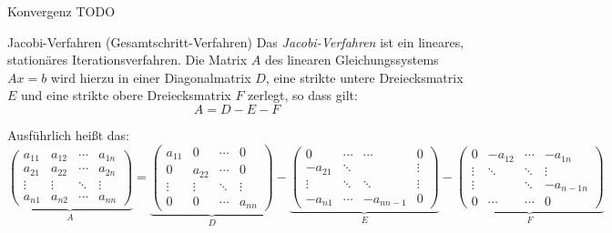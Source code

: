 \begin{example}{Konvergenz}
    TODO
\end{example}

\begin{defi}{Jacobi-Verfahren (Gesamtschritt-Verfahren)}
    Das \emph{Jacobi-Verfahren} ist ein lineares, stationäres Iterationsverfahren.
    Die Matrix $A$ des linearen Gleichungssystems $Ax = b$ wird hierzu in einer Diagonalmatrix $D$, eine strikte untere Dreiecksmatrix $E$ und eine strikte obere Dreiecksmatrix $F$ zerlegt, so dass gilt:
    \[
        A = D - E - F
    \]

    Ausführlich heißt das:
    {
    \footnotesize
    \[
        \underbrace{
            \begin{pmatrix}
                a_{11} & a_{12} & \cdots & a_{1n} \\
                a_{21} & a_{22} & \cdots & a_{2n} \\
                \vdots & \vdots & \ddots & \vdots \\
                a_{n1} & a_{n2} & \cdots & a_{nn}
            \end{pmatrix}
        }_A
        =
        \underbrace{
            \begin{pmatrix}
                a_{11} & 0      & \cdots & 0      \\
                0      & a_{22} & \cdots & 0      \\
                \vdots & \vdots & \ddots & \vdots \\
                0      & 0      & \cdots & a_{nn}
            \end{pmatrix}
        }_D
        -
        \underbrace{
            \begin{pmatrix}
                0        & \cdots & \cdots     & 0      \\
                - a_{21} & \ddots &            & \vdots \\
                \vdots   & \ddots & \ddots     & \vdots \\
                - a_{n1} & \cdots & - a_{nn-1} & 0
            \end{pmatrix}
        }_E
        -
        \underbrace{
            \begin{pmatrix}
                0      & - a_{12} & \cdots & - a_{1n}   \\
                \vdots & \ddots   & \ddots & \vdots     \\
                \vdots &          & \ddots & - a_{n-1n} \\
                0      & \cdots   & \cdots & 0
            \end{pmatrix}
        }_F
    \]
    }


\end{defi}
